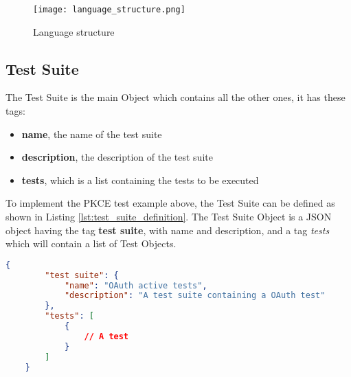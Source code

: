 \begin{figure}
    \texttt{[image: language\_structure.png]}
    \caption{Language structure}
    \label{fig:language_structure}
\end{figure}

\subsection{Test Suite}
The Test Suite is the main Object which contains all the other ones, it has these tags:

\begin{itemize}
    \item \textbf{name}, the name of the test suite
    \item \textbf{description}, the description of the test suite
    \item \textbf{tests}, which is a list containing the tests to be executed
\end{itemize}
To implement the \gls{PKCE} test example above, the Test Suite can be defined as shown in Listing \ref{lst:test_suite_definition}. The Test Suite Object is a JSON object having the tag \textbf{test suite}, with name and description, and a tag \textit{tests} which will contain a list of Test Objects.

\begin{lstlisting}[language=json, caption=Test Suite definition, label={lst:test_suite_definition}]
    {
        "test suite": {
            "name": "OAuth active tests",
            "description": "A test suite containing a OAuth test"
        },
        "tests": [
            {
                // A test
            }
        ]
    }
\end{lstlisting}

